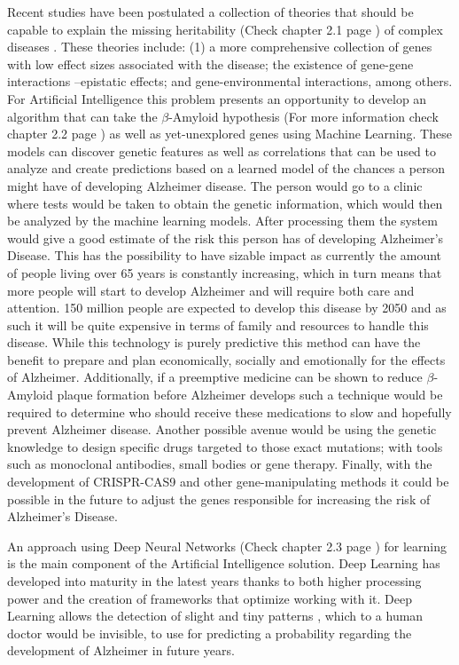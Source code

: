 Recent studies have been postulated a collection of theories that should be capable to explain the missing heritability (Check chapter 2.1 page \pageref{missHerit}) of complex diseases \cite{Manolio2009}\cite{Eichler2010}. These theories include: (1) a more comprehensive collection of genes with low effect sizes associated with the disease; the existence of gene-gene interactions --epistatic effects; and gene-environmental interactions, among others.
\newpage
For Artificial Intelligence this problem presents an opportunity to develop an algorithm that can take the $\beta$-Amyloid hypothesis (For more information check chapter 2.2 page \pageref{betaAmyloid}) as well as yet-unexplored genes using Machine Learning. These models can discover genetic features as well as correlations that can be used to analyze and create predictions based on a learned model of the chances a person might have of developing Alzheimer disease. The person would go to a clinic where tests would be taken to obtain the genetic information, which would then be analyzed by the machine learning models. After processing them the system would give a good estimate of the risk this person has of developing Alzheimer's Disease. This has the possibility to have sizable impact as currently the amount of people living over 65 years is constantly increasing, which in turn means that more people will start to develop Alzheimer and will require both care and attention. 150 million people are expected to develop this disease by 2050 and as such it will be quite expensive in terms of family and resources to handle this disease. While this technology is purely predictive this method can have the benefit to prepare and plan economically, socially and emotionally for the effects of Alzheimer. Additionally, if a preemptive medicine can be shown to reduce $\beta$-Amyloid plaque formation before Alzheimer develops such a technique would be required to determine who should receive these medications to slow and hopefully prevent Alzheimer disease. Another possible avenue would be using the genetic knowledge to design specific drugs targeted to those exact mutations; with tools such as monoclonal antibodies, small bodies or gene therapy. Finally, with the development of CRISPR-CAS9 and other gene-manipulating methods it could be possible in the future to adjust the genes responsible for increasing the risk of Alzheimer's Disease.

An approach using Deep Neural Networks (Check chapter 2.3 page \pageref{DNNs}) for learning is the main component of the Artificial Intelligence solution. Deep Learning has developed into maturity in the latest years thanks to both higher processing power and the creation of frameworks that optimize working with it. Deep Learning allows the detection of slight and tiny patterns \cite{Schmidhuber2015}, which to a human doctor would be invisible, to use for predicting a probability regarding the development of Alzheimer in future years\cite{Jessen2014}. 

